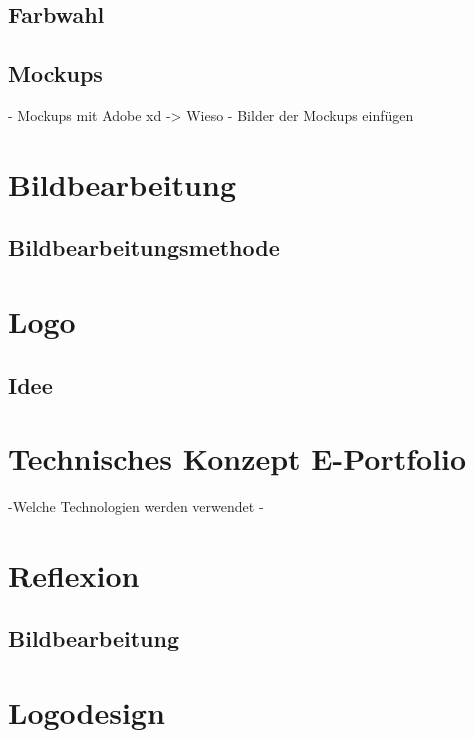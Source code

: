\documentclass[11pt]{article}
\begin{document}
    \subsection{Farbwahl}

    \subsection{Mockups}
    - Mockups mit Adobe xd -> Wieso
    - Bilder der Mockups einfügen

    \section{Bildbearbeitung}

    \subsection{Bildbearbeitungsmethode}

    \section{Logo}

    \subsection{Idee}

    \section{Technisches Konzept E-Portfolio}
    -Welche Technologien werden verwendet
    -

    \section{Reflexion}

    \subsection{Bildbearbeitung}

    \section{Logodesign}
\end{document}
